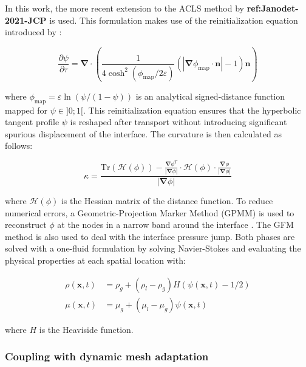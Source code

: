 In this work, the more recent extension to the ACLS method by \textbf{ref:Janodet-2021-JCP} is used. This formulation makes use of the reinitialization equation introduced by :

\begin{equation}
\label{eq:acls_reinit_2017}
\frac{\partial\psi}{\partial \tau}=\boldsymbol{\nabla}\cdot\left(\frac{1}{4\cosh^2{\left(\phi_{\mathrm{map}}/2\varepsilon\right)}}\left(|\boldsymbol{\nabla}\phi_{\mathrm{map}}\cdot\textbf{n}|-1\right)\textbf{n}\right)
\end{equation}

where $\phi_{\mathrm{map}}=\varepsilon\ln\left({\psi}/({1-\psi})\right)$ is an analytical signed-distance function mapped for $\psi \in ]0;1[$. This reinitialization equation ensures that the hyperbolic tangent profile $\psi$ is reshaped after transport without introducing significant spurious displacement of the interface. The curvature is then calculated as follows:

\begin{equation}
\kappa=\frac{\mathrm{Tr}\left(\boldsymbol{\mathcal{H}}(\phi)\right)-\frac{\boldsymbol{\nabla}\phi^T}{|\boldsymbol{\nabla}\phi|}\cdot\boldsymbol{\mathcal{H}}\left(\phi\right)\cdot\frac{\boldsymbol{\nabla}\phi}{|\boldsymbol{\nabla}\phi|}}{|\boldsymbol{\nabla}\phi|}
\label{eq:curvature_Goldman}
\end{equation}

where $\mathcal{H} \left( \phi \right)$ is the Hessian matrix of the distance function. To reduce numerical errors, a Geometric-Projection Marker Method (GPMM) is used to reconstruct $\phi$ at the nodes in a narrow band around the interface . The GFM method is also used to deal with the interface pressure jump. Both phases are solved with a one-fluid formulation by solving Navier-Stokes and evaluating the physical properties at each spatial location with:

\begin{subequations}
\begin{align}
\rho(\textbf{x},t) &= \rho_g+(\rho_l-\rho_g)H(\psi(\textbf{x},t)-1/2)  \\
\mu(\textbf{x},t) &= \mu_g+(\mu_l-\mu_g)\psi(\textbf{x},t)
\end{align}
\end{subequations}

where $H$ is the Heaviside function.

\subsubsection*{Coupling with dynamic mesh adaptation}

